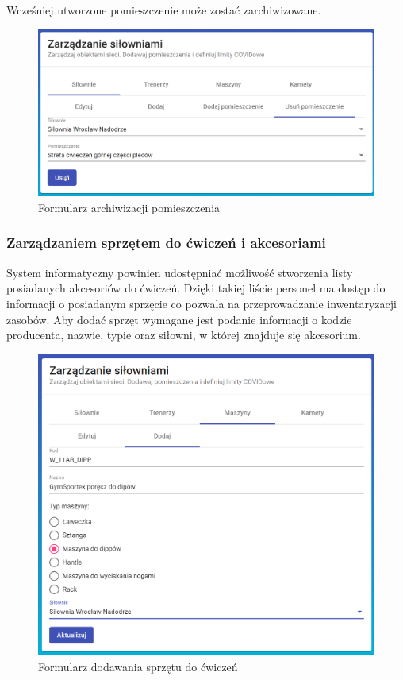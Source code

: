 \documentclass[a4paper,twoside,12pt]{book}
\begin{document}
Wcześniej utworzone pomieszczenie może zostać zarchiwizowane.
\begin{figure}[h!]
	\centering
	\includegraphics[width=1\linewidth]{../zrzuty_ekranu/dzialanie/pomieszczenia/usuwanie}
	\caption{Formularz archiwizacji pomieszczenia}
	\label{fig:archwizacja_pomieszczenia}
\end{figure}
\FloatBarrier


\subsubsection{Zarządzaniem sprzętem do ćwiczeń i akcesoriami}
System informatyczny powinien udostępniać możliwość stworzenia listy posiadanych akcesoriów do ćwiczeń. Dzięki takiej liście personel ma dostęp do informacji o posiadanym sprzęcie co pozwala na przeprowadzanie inwentaryzacji zasobów. Aby dodać sprzęt wymagane jest podanie informacji o kodzie producenta, nazwie, typie oraz siłowni, w której znajduje się akcesorium.
\begin{figure}[h!]
	\centering
	\includegraphics[width=1\linewidth]{../zrzuty_ekranu/dzialanie/akcesoria/dodawanie_akcesoriun}
	\caption{Formularz dodawania sprzętu do ćwiczeń}
	\label{fig:dodawanieakcesoriun}
\end{figure}
\FloatBarrier
\end{document}
